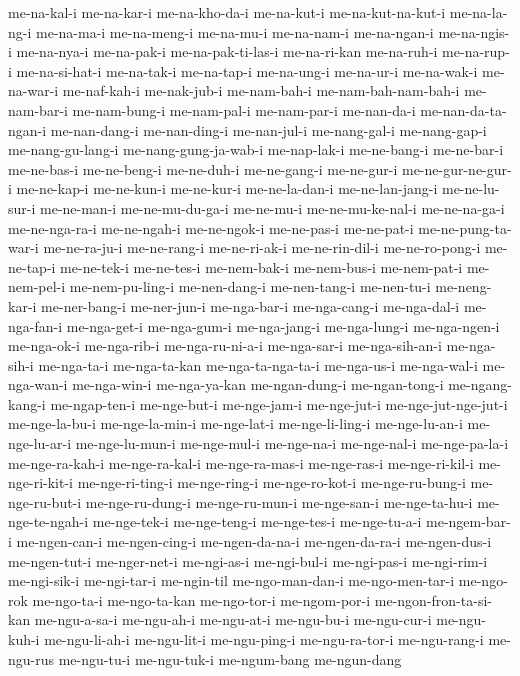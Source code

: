 {me-na-kal-i me-na-kar-i me-na-kho-da-i me-na-kut-i me-na-kut-na-kut-i
me-na-la-ng-i me-na-ma-i me-na-meng-i me-na-mu-i me-na-nam-i me-na-ngan-i
me-na-ngis-i me-na-nya-i me-na-pak-i me-na-pak-ti-las-i me-na-ri-kan
me-na-ruh-i me-na-rup-i me-na-si-hat-i me-na-tak-i me-na-tap-i me-na-ung-i
me-na-ur-i me-na-wak-i me-na-war-i me-naf-kah-i me-nak-jub-i me-nam-bah-i
me-nam-bah-nam-bah-i me-nam-bar-i me-nam-bung-i me-nam-pal-i me-nam-par-i
me-nan-da-i me-nan-da-ta-ngan-i me-nan-dang-i me-nan-ding-i me-nan-jul-i
me-nang-gal-i me-nang-gap-i me-nang-gu-lang-i me-nang-gung-ja-wab-i
me-nap-lak-i me-ne-bang-i me-ne-bar-i me-ne-bas-i me-ne-beng-i me-ne-duh-i
me-ne-gang-i me-ne-gur-i me-ne-gur-ne-gur-i me-ne-kap-i me-ne-kun-i
me-ne-kur-i me-ne-la-dan-i me-ne-lan-jang-i me-ne-lu-sur-i me-ne-man-i
me-ne-mu-du-ga-i me-ne-mu-i me-ne-mu-ke-nal-i me-ne-na-ga-i me-ne-nga-ra-i
me-ne-ngah-i me-ne-ngok-i me-ne-pas-i me-ne-pat-i me-ne-pung-ta-war-i
me-ne-ra-ju-i me-ne-rang-i me-ne-ri-ak-i me-ne-rin-dil-i me-ne-ro-pong-i
me-ne-tap-i me-ne-tek-i me-ne-tes-i me-nem-bak-i me-nem-bus-i me-nem-pat-i
me-nem-pel-i me-nem-pu-ling-i me-nen-dang-i me-nen-tang-i me-nen-tu-i
me-neng-kar-i me-ner-bang-i me-ner-jun-i me-nga-bar-i me-nga-cang-i
me-nga-dal-i me-nga-fan-i me-nga-get-i me-nga-gum-i me-nga-jang-i
me-nga-lung-i me-nga-ngen-i me-nga-ok-i me-nga-rib-i me-nga-ru-ni-a-i
me-nga-sar-i me-nga-sih-an-i me-nga-sih-i me-nga-ta-i me-nga-ta-kan
me-nga-ta-nga-ta-i me-nga-us-i me-nga-wal-i me-nga-wan-i me-nga-win-i
me-nga-ya-kan me-ngan-dung-i me-ngan-tong-i me-ngang-kang-i me-ngap-ten-i
me-nge-but-i me-nge-jam-i me-nge-jut-i me-nge-jut-nge-jut-i me-nge-la-bu-i
me-nge-la-min-i me-nge-lat-i me-nge-li-ling-i me-nge-lu-an-i
me-nge-lu-ar-i me-nge-lu-mun-i me-nge-mul-i me-nge-na-i me-nge-nal-i
me-nge-pa-la-i me-nge-ra-kah-i me-nge-ra-kal-i me-nge-ra-mas-i
me-nge-ras-i me-nge-ri-kil-i me-nge-ri-kit-i me-nge-ri-ting-i
me-nge-ring-i me-nge-ro-kot-i me-nge-ru-bung-i me-nge-ru-but-i
me-nge-ru-dung-i me-nge-ru-mun-i me-nge-san-i me-nge-ta-hu-i
me-nge-te-ngah-i me-nge-tek-i me-nge-teng-i me-nge-tes-i me-nge-tu-a-i
me-ngem-bar-i me-ngen-can-i me-ngen-cing-i me-ngen-da-na-i me-ngen-da-ra-i
me-ngen-dus-i me-ngen-tut-i me-nger-net-i me-ngi-as-i me-ngi-bul-i
me-ngi-pas-i me-ngi-rim-i me-ngi-sik-i me-ngi-tar-i me-ngin-til
me-ngo-man-dan-i me-ngo-men-tar-i me-ngo-rok me-ngo-ta-i me-ngo-ta-kan
me-ngo-tor-i me-ngom-por-i me-ngon-fron-ta-si-kan me-ngu-a-sa-i
me-ngu-ah-i me-ngu-at-i me-ngu-bu-i me-ngu-cur-i me-ngu-kuh-i
me-ngu-li-ah-i me-ngu-lit-i me-ngu-ping-i me-ngu-ra-tor-i me-ngu-rang-i
me-ngu-rus me-ngu-tu-i me-ngu-tuk-i me-ngum-bang me-ngun-dang
}
